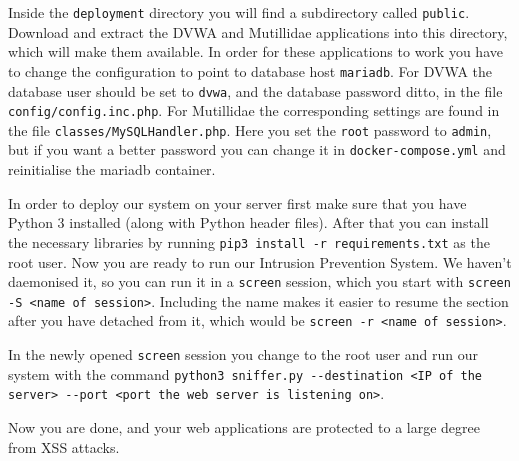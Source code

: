 \documentclass[10pt,journal,compsoc]{IEEEtran}
\begin{document}
Inside the \verb|deployment| directory you will find a subdirectory called \verb|public|. Download and extract the DVWA
and Mutillidae applications into this directory, which will make them available. In order for these applications to work
you have to change the configuration to point to database host \verb|mariadb|. For DVWA the database user should
be set to \verb|dvwa|, and the database password ditto, in the file \verb|config/config.inc.php|. For Mutillidae the
corresponding settings are found in the file \verb|classes/MySQLHandler.php|. Here you set the \verb|root| password to
\verb|admin|, but if you want a better password you can change it in \verb|docker-compose.yml| and reinitialise the mariadb
container.

In order to deploy our system on your server first make sure that you have Python 3 installed (along with Python header
files). After that you can install the necessary libraries by running \verb|pip3 install -r requirements.txt| as the
root user. Now you are ready to run our Intrusion Prevention System. We haven't daemonised it, so you can run it in a
\verb|screen| session, which you start with \verb|screen -S <name of session>|. Including the name makes it easier to
resume the section after you have detached from it, which would be \verb|screen -r <name of session>|.

In the newly opened \verb|screen| session you change to the root user and run our system with the command
\verb|python3 sniffer.py --destination <IP of the server> --port <port the web server is listening on>|.

Now you are done, and your web applications are protected to a large degree from XSS attacks.






\ifCLASSOPTIONcaptionsoff
  \newpage
\fi
\end{document}
